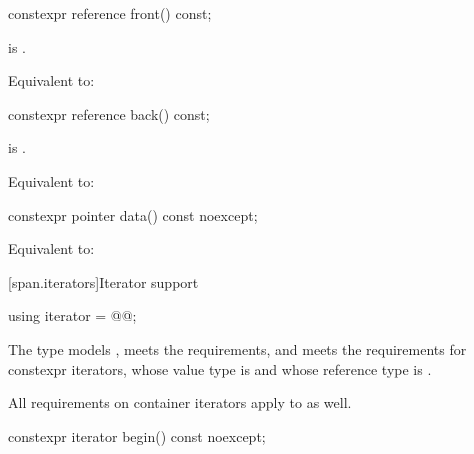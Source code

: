 %
\begin{itemdecl}
constexpr reference front() const;
\end{itemdecl}

\begin{itemdescr}
\pnum
\expects
{} is .

\pnum
\effects
Equivalent to: 
\end{itemdescr}

%
\begin{itemdecl}
constexpr reference back() const;
\end{itemdecl}

\begin{itemdescr}
\pnum
\expects
{} is .

\pnum
\effects
Equivalent to: 
\end{itemdescr}

%
\begin{itemdecl}
constexpr pointer data() const noexcept;
\end{itemdecl}

\begin{itemdescr}
\pnum
\effects
Equivalent to: 
\end{itemdescr}

[span.iterators]{Iterator support}

%
\begin{itemdecl}
using iterator = @@;
\end{itemdecl}

\begin{itemdescr}
\pnum
The type
models ,
meets the 
requirements,
and
meets the requirements for
constexpr iterators,
whose value type is  and
whose reference type is .

\pnum
All requirements on container iterators apply to
 as well.
\end{itemdescr}

%
\begin{itemdecl}
constexpr iterator begin() const noexcept;
\end{itemdecl}

